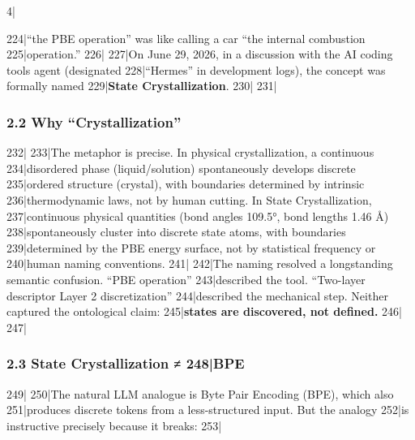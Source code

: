 4|\documentclass[
5|  12pt,
6|]{article}
\begin{document}
224|``the PBE operation'' was like calling a car ``the internal combustion
225|operation.''
226|
227|On June 29, 2026, in a discussion with the AI coding tools agent (designated
228|``Hermes'' in development logs), the concept was formally named
229|\textbf{State Crystallization}.
230|
231|\subsubsection{2.2 Why ``Crystallization''}\label{why-crystallization}
232|
233|The metaphor is precise. In physical crystallization, a continuous
234|disordered phase (liquid/solution) spontaneously develops discrete
235|ordered structure (crystal), with boundaries determined by intrinsic
236|thermodynamic laws, not by human cutting. In State Crystallization,
237|continuous physical quantities (bond angles 109.5°, bond lengths 1.46 Å)
238|spontaneously cluster into discrete state atoms, with boundaries
239|determined by the PBE energy surface, not by statistical frequency or
240|human naming conventions.
241|
242|The naming resolved a longstanding semantic confusion. ``PBE operation''
243|described the tool. ``Two-layer descriptor Layer 2 discretization''
244|described the mechanical step. Neither captured the ontological claim:
245|\textbf{states are discovered, not defined.}
246|
247|\subsubsection{2.3 State Crystallization ≠
248|BPE}\label{state-crystallization-bpe}
249|
250|The natural LLM analogue is Byte Pair Encoding (BPE), which also
251|produces discrete tokens from a less-structured input. But the analogy
252|is instructive precisely because it breaks:
253|
\end{document}
